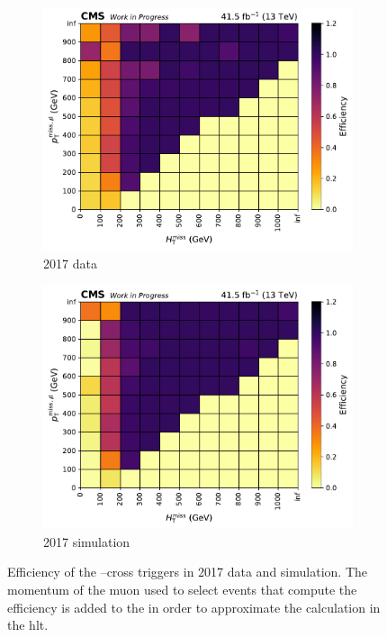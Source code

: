 \begin{figure}[htbp]
    \centering
    \begin{subfigure}[b]{0.48\textwidth}
        \includegraphics[width=\textwidth]{figures/trigger_efficiencies/2017/eff-data--n.pdf}
        \caption{2017 data}
    \end{subfigure}
    \hfill
    \begin{subfigure}[b]{0.48\textwidth}
        \includegraphics[width=\textwidth]{figures/trigger_efficiencies/2017/eff-mc--genWeight-sumw.pdf}
        \caption{2017 simulation}
    \end{subfigure}
    \caption[Efficiency of the HLT \ptmiss--\mht cross triggers in 2017 data and simulation]{Efficiency of the \ptmiss--\mht cross triggers in 2017 data and simulation. The momentum of the muon used to select events that compute the efficiency is added to the \ptmiss in order to approximate the calculation in the \acrlong{hlt}.}
    \label{fig:htoinv_trig_effs_2017}
\end{figure}

